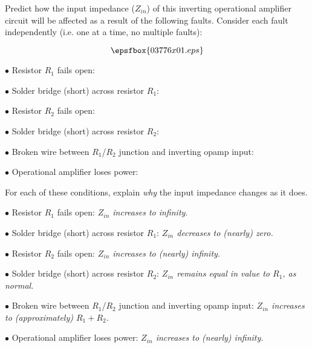 

Predict how the input impedance ($Z_{in}$) of this inverting operational amplifier circuit will be affected as a result of the following faults.  Consider each fault independently (i.e. one at a time, no multiple faults):

$$\epsfbox{03776x01.eps}$$

\medskip
\item{$\bullet$} Resistor $R_1$ fails open:
\vskip 5pt
\item{$\bullet$} Solder bridge (short) across resistor $R_1$:
\vskip 5pt
\item{$\bullet$} Resistor $R_2$ fails open:
\vskip 5pt
\item{$\bullet$} Solder bridge (short) across resistor $R_2$:
\vskip 5pt
\item{$\bullet$} Broken wire between $R_1$/$R_2$ junction and inverting opamp input:
\vskip 5pt
\item{$\bullet$} Operational amplifier loses power:
\medskip

For each of these conditions, explain {\it why} the input impedance changes as it does.







\medskip
\item{$\bullet$} Resistor $R_1$ fails open: {\it $Z_{in}$ increases to infinity.}
\vskip 5pt
\item{$\bullet$} Solder bridge (short) across resistor $R_1$: {\it $Z_{in}$ decreases to (nearly) zero.} 
\vskip 5pt
\item{$\bullet$} Resistor $R_2$ fails open: {\it $Z_{in}$ increases to (nearly) infinity.} 
\vskip 5pt
\item{$\bullet$} Solder bridge (short) across resistor $R_2$: {\it $Z_{in}$ remains equal in value to $R_1$, as normal.} 
\vskip 5pt
\item{$\bullet$} Broken wire between $R_1$/$R_2$ junction and inverting opamp input: {\it $Z_{in}$ increases to (approximately) $R_1 + R_2$.} 
\vskip 5pt
\item{$\bullet$} Operational amplifier loses power: {\it $Z_{in}$ increases to (nearly) infinity.}
\medskip

